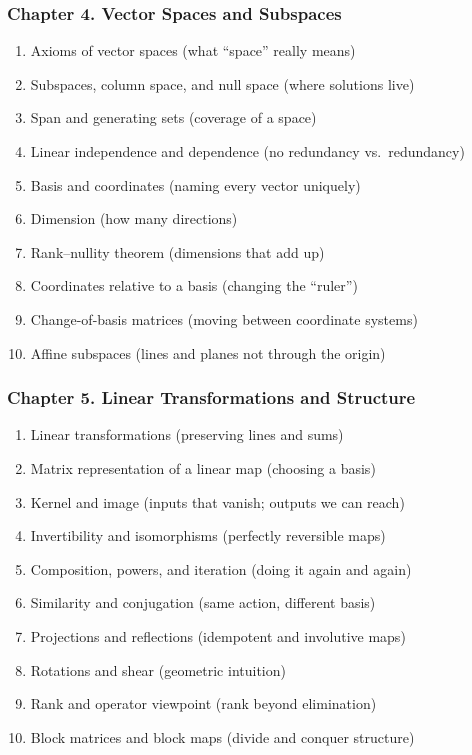 \documentclass[
  letterpaper,
  DIV=11,
  numbers=noendperiod]{scrreprt}
\providecommand{\tightlist}{%
  \setlength{\itemsep}{0pt}\setlength{\parskip}{0pt}}
\begin{document}
\subsubsection{Chapter 4. Vector Spaces and
Subspaces}\label{chapter-4.-vector-spaces-and-subspaces}

\begin{enumerate}
\def\labelenumi{\arabic{enumi}.}
\setcounter{enumi}{30}
\tightlist
\item
  Axioms of vector spaces (what ``space'' really means)
\item
  Subspaces, column space, and null space (where solutions live)
\item
  Span and generating sets (coverage of a space)
\item
  Linear independence and dependence (no redundancy vs.~redundancy)
\item
  Basis and coordinates (naming every vector uniquely)
\item
  Dimension (how many directions)
\item
  Rank--nullity theorem (dimensions that add up)
\item
  Coordinates relative to a basis (changing the ``ruler'')
\item
  Change-of-basis matrices (moving between coordinate systems)
\item
  Affine subspaces (lines and planes not through the origin)
\end{enumerate}

\subsubsection{Chapter 5. Linear Transformations and
Structure}\label{chapter-5.-linear-transformations-and-structure}

\begin{enumerate}
\def\labelenumi{\arabic{enumi}.}
\setcounter{enumi}{40}
\tightlist
\item
  Linear transformations (preserving lines and sums)
\item
  Matrix representation of a linear map (choosing a basis)
\item
  Kernel and image (inputs that vanish; outputs we can reach)
\item
  Invertibility and isomorphisms (perfectly reversible maps)
\item
  Composition, powers, and iteration (doing it again and again)
\item
  Similarity and conjugation (same action, different basis)
\item
  Projections and reflections (idempotent and involutive maps)
\item
  Rotations and shear (geometric intuition)
\item
  Rank and operator viewpoint (rank beyond elimination)
\item
  Block matrices and block maps (divide and conquer structure)
\end{enumerate}
\end{document}
